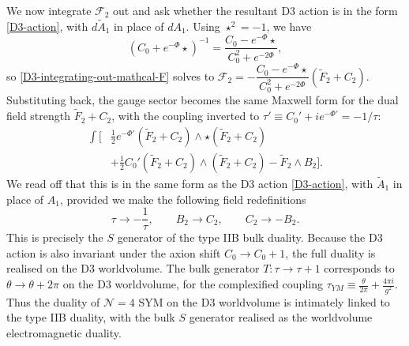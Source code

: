 We now integrate $\mathcal F_2$ out and ask whether the resultant D3 action is in the form \eqref{D3-action}, with $d\tilde A_1$ in place of $dA_1$. 
Using $\star^2=-1$, we have
\begin{equation}
(C_0+e^{-\Phi}\star)^{-1} = \frac{C_0-e^{-\Phi}\star}{C_0^2+e^{-2\Phi}},
\end{equation}
so \eqref{D3-integrating-out-mathcal-F} solves to $\mathcal F_2 = -\dfrac{C_0-e^{-\Phi}\star}{C_0^2+e^{-2\Phi}}(\tilde F_2+C_2)$. Substituting back, the gauge sector becomes the same Maxwell form for the dual field strength $\tilde F_2+C_2$, with the coupling inverted to $\tau'\equiv C_0'+ie^{-\Phi'}=-1/\tau$:
\begin{equation}
\begin{aligned}
\int\bigg[&\tfrac{1}{2}e^{-\Phi'}(\tilde F_2+C_2)\wedge\star(\tilde F_2+C_2)\\
&+\tfrac{1}{2}C_0'(\tilde F_2+C_2)\wedge(\tilde F_2+C_2)-\tilde F_2\wedge B_2\bigg].
\end{aligned}
\end{equation}
We read off that this is in the same form as the D3 action \eqref{D3-action}, with $\tilde A_1$ in place of $A_1$, provided we make the following field redefinitions
\begin{equation}
\tau\to-\frac{1}{\tau},\qquad
B_2 \to C_2,\qquad C_2\to -B_2.
\end{equation}
This is precisely the $S$ generator of the type IIB bulk \SLZ{} duality.
Because the D3 action is also invariant under the axion shift $C_0\to C_0+1$, the full \SLZ{} duality is realised on the D3 worldvolume.
The bulk generator $T: \tau\to \tau+1$ corresponds to $\theta\to \theta + 2\pi$ on the D3 worldvolume, for the complexified coupling $\tau_{YM}\equiv \frac{\theta}{2\pi} + \frac{4\pi i}{g^2}$.
Thus the \SLZ{} duality of $\mathcal N=4$ SYM on the D3 worldvolume is intimately linked to the type IIB \SLZ{} duality, with the bulk $S$ generator realised as the worldvolume electromagnetic duality.

